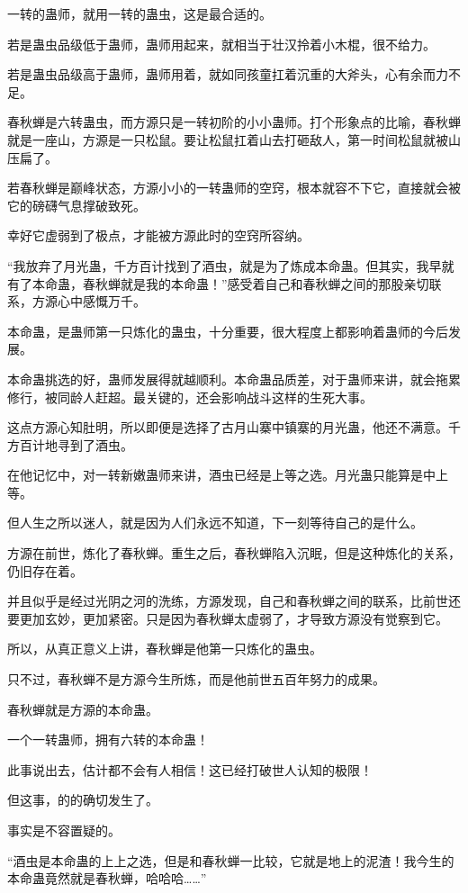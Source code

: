 \begin{this_body}
一转的蛊师，就用一转的蛊虫，这是最合适的。

若是蛊虫品级低于蛊师，蛊师用起来，就相当于壮汉拎着小木棍，很不给力。

若是蛊虫品级高于蛊师，蛊师用着，就如同孩童扛着沉重的大斧头，心有余而力不足。

春秋蝉是六转蛊虫，而方源只是一转初阶的小小蛊师。打个形象点的比喻，春秋蝉就是一座山，方源是一只松鼠。要让松鼠扛着山去打砸敌人，第一时间松鼠就被山压扁了。

若春秋蝉是巅峰状态，方源小小的一转蛊师的空窍，根本就容不下它，直接就会被它的磅礴气息撑破致死。

幸好它虚弱到了极点，才能被方源此时的空窍所容纳。

“我放弃了月光蛊，千方百计找到了酒虫，就是为了炼成本命蛊。但其实，我早就有了本命蛊，春秋蝉就是我的本命蛊！”感受着自己和春秋蝉之间的那股亲切联系，方源心中感慨万千。

本命蛊，是蛊师第一只炼化的蛊虫，十分重要，很大程度上都影响着蛊师的今后发展。

本命蛊挑选的好，蛊师发展得就越顺利。本命蛊品质差，对于蛊师来讲，就会拖累修行，被同龄人赶超。最关键的，还会影响战斗这样的生死大事。

这点方源心知肚明，所以即便是选择了古月山寨中镇寨的月光蛊，他还不满意。千方百计地寻到了酒虫。

在他记忆中，对一转新嫩蛊师来讲，酒虫已经是上等之选。月光蛊只能算是中上等。

但人生之所以迷人，就是因为人们永远不知道，下一刻等待自己的是什么。

方源在前世，炼化了春秋蝉。重生之后，春秋蝉陷入沉眠，但是这种炼化的关系，仍旧存在着。

并且似乎是经过光阴之河的洗练，方源发现，自己和春秋蝉之间的联系，比前世还要更加玄妙，更加紧密。只是因为春秋蝉太虚弱了，才导致方源没有觉察到它。

所以，从真正意义上讲，春秋蝉是他第一只炼化的蛊虫。

只不过，春秋蝉不是方源今生所炼，而是他前世五百年努力的成果。

春秋蝉就是方源的本命蛊。

一个一转蛊师，拥有六转的本命蛊！

此事说出去，估计都不会有人相信！这已经打破世人认知的极限！

但这事，的的确切发生了。

事实是不容置疑的。

“酒虫是本命蛊的上上之选，但是和春秋蝉一比较，它就是地上的泥渣！我今生的本命蛊竟然就是春秋蝉，哈哈哈……”

\end{this_body}

